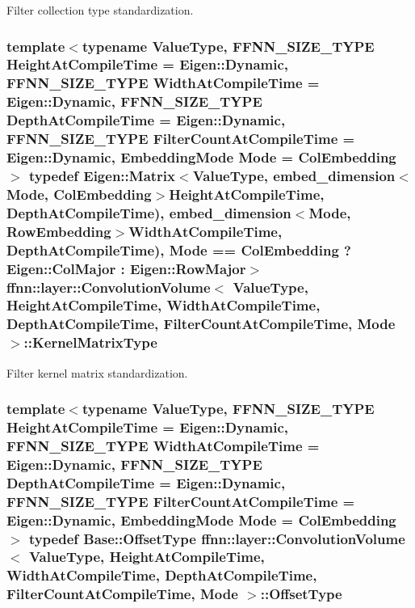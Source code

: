 Filter collection type standardization. 

\hypertarget{classffnn_1_1layer_1_1_convolution_volume_ad928a402aa7aa7e5fb3cd5b7f088f73e}{
\subsubsection[{Kernel\-Matrix\-Type}]{\setlength{\rightskip}{0pt plus 5cm}template$<$typename Value\-Type, F\-F\-N\-N\-\_\-\-S\-I\-Z\-E\-\_\-\-T\-Y\-P\-E Height\-At\-Compile\-Time = Eigen\-::\-Dynamic, F\-F\-N\-N\-\_\-\-S\-I\-Z\-E\-\_\-\-T\-Y\-P\-E Width\-At\-Compile\-Time = Eigen\-::\-Dynamic, F\-F\-N\-N\-\_\-\-S\-I\-Z\-E\-\_\-\-T\-Y\-P\-E Depth\-At\-Compile\-Time = Eigen\-::\-Dynamic, F\-F\-N\-N\-\_\-\-S\-I\-Z\-E\-\_\-\-T\-Y\-P\-E Filter\-Count\-At\-Compile\-Time = Eigen\-::\-Dynamic, Embedding\-Mode Mode = Col\-Embedding$>$ typedef Eigen\-::\-Matrix$<$Value\-Type, {\bf embed\-\_\-dimension}$<$Mode, {\bf Col\-Embedding}$>$Height\-At\-Compile\-Time, Depth\-At\-Compile\-Time), {\bf embed\-\_\-dimension}$<$Mode, {\bf Row\-Embedding}$>$Width\-At\-Compile\-Time, Depth\-At\-Compile\-Time), Mode == {\bf Col\-Embedding} ? Eigen\-::\-Col\-Major \-: Eigen\-::\-Row\-Major$>$ {\bf ffnn\-::layer\-::\-Convolution\-Volume}$<$ Value\-Type, Height\-At\-Compile\-Time, Width\-At\-Compile\-Time, Depth\-At\-Compile\-Time, Filter\-Count\-At\-Compile\-Time, Mode $>$\-::{\bf Kernel\-Matrix\-Type}}}\label{classffnn_1_1layer_1_1_convolution_volume_ad928a402aa7aa7e5fb3cd5b7f088f73e}


Filter kernel matrix standardization. 

\hypertarget{classffnn_1_1layer_1_1_convolution_volume_a17bdd4d0402730cbc4cd491cb8c3bdfd}{
\subsubsection[{Offset\-Type}]{\setlength{\rightskip}{0pt plus 5cm}template$<$typename Value\-Type, F\-F\-N\-N\-\_\-\-S\-I\-Z\-E\-\_\-\-T\-Y\-P\-E Height\-At\-Compile\-Time = Eigen\-::\-Dynamic, F\-F\-N\-N\-\_\-\-S\-I\-Z\-E\-\_\-\-T\-Y\-P\-E Width\-At\-Compile\-Time = Eigen\-::\-Dynamic, F\-F\-N\-N\-\_\-\-S\-I\-Z\-E\-\_\-\-T\-Y\-P\-E Depth\-At\-Compile\-Time = Eigen\-::\-Dynamic, F\-F\-N\-N\-\_\-\-S\-I\-Z\-E\-\_\-\-T\-Y\-P\-E Filter\-Count\-At\-Compile\-Time = Eigen\-::\-Dynamic, Embedding\-Mode Mode = Col\-Embedding$>$ typedef {\bf Base\-::\-Offset\-Type} {\bf ffnn\-::layer\-::\-Convolution\-Volume}$<$ Value\-Type, Height\-At\-Compile\-Time, Width\-At\-Compile\-Time, Depth\-At\-Compile\-Time, Filter\-Count\-At\-Compile\-Time, Mode $>$\-::{\bf Offset\-Type}}}\label{classffnn_1_1layer_1_1_convolution_volume_a17bdd4d0402730cbc4cd491cb8c3bdfd}


